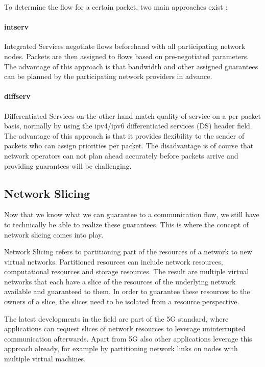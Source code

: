 To determine the flow for a certain packet, two main approaches exist \cite{serv}:

\paragraph{\acrshort{intserv}} Integrated Services \cite{rfc1633} negotiate flows beforehand with all participating network nodes. Packets are then assigned to flows based on pre-negotiated parameters. The advantage of this approach is that \gls{bandwidth} and other assigned guarantees can be planned by the participating network providers in advance.

\paragraph{\acrshort{diffserv}} Differentiated Services \cite{rfc2474} on the other hand match quality of service on a per packet basis, normally by using the \acrshort{ipv4}/\acrshort{ipv6} differentiated services (DS) header field. The advantage of this approach is that it provides flexibility to the sender of packets who can assign priorities per packet. The disadvantage is of course that network operators can not plan ahead accurately before packets arrive and providing guarantees will be challenging.

\subsection{Network Slicing}
Now that we know what we can guarantee to a communication flow, we still have to technically be able to realize these guarantees. This is where the concept of network slicing comes into play.

Network Slicing \cite{slicing} refers to partitioning part of the resources of a network to new virtual networks. Partitioned resources can include network resources, computational resources and storage resources. The result are multiple virtual networks that each have a slice of the resources of the underlying network available and guaranteed to them. In order to guarantee these resources to the owners of a slice, the slices need to be isolated from a resource perspective.

The latest developments in the field are part of the 5G standard, where applications can request slices of network resources to leverage uninterrupted communication afterwards. Apart from 5G also other applications leverage this approach already, for example by partitioning network links on nodes with multiple virtual machines.


